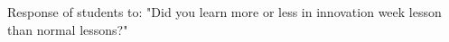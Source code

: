 \label{fig:learn} Response of students to: "Did you learn more or less in innovation week lesson than normal lessons?"